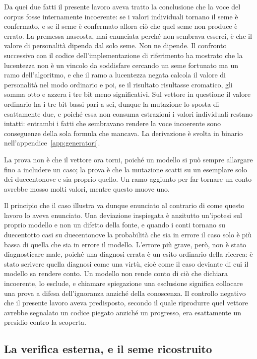 Da quei due fatti il presente lavoro aveva tratto la conclusione che la voce del corpus fosse internamente incoerente: se i valori individuali tornano il seme è confermato, e se il seme è confermato allora ciò che quel seme non produce è errato. La premessa nascosta, mai enunciata perché non sembrava esserci, è che il valore di personalità dipenda dal solo seme. Non ne dipende. Il confronto successivo con il codice dell'implementazione di riferimento ha mostrato che la lucentezza non è un vincolo da soddisfare cercando un seme fortunato ma un ramo dell'algoritmo, e che il ramo a lucentezza negata calcola il valore di personalità nel modo ordinario e poi, se il risultato risultasse cromatico, gli somma otto e azzera i tre bit meno significativi. Sul vettore in questione il valore ordinario ha i tre bit bassi pari a sei, dunque la mutazione lo sposta di esattamente due, e poiché essa non consuma estrazioni i valori individuali restano intatti: entrambi i fatti che sembravano rendere la voce incoerente sono conseguenze della sola formula che mancava. La derivazione è svolta in binario nell'appendice~\ref{app:generatori}.

La prova non è che il vettore ora torni, poiché un modello si può sempre allargare fino a includere un caso; la prova è che la mutazione scatti su un esemplare solo dei duecentonove e sia proprio quello. Un ramo aggiunto per far tornare un conto avrebbe mosso molti valori, mentre questo muove uno.

Il principio che il caso illustra va dunque enunciato al contrario di come questo lavoro lo aveva enunciato. Una deviazione inspiegata è anzitutto un'ipotesi sul proprio modello e non un difetto della fonte, e quando i conti tornano su duecentotto casi su duecentonove la probabilità che sia in errore il caso solo è più bassa di quella che sia in errore il modello. L'errore più grave, però, non è stato diagnosticare male, poiché una diagnosi errata è un esito ordinario della ricerca: è stato scrivere quella diagnosi come una virtù, cioè come il caso deviante di cui il modello sa rendere conto. Un modello non rende conto di ciò che dichiara incoerente, lo esclude, e chiamare spiegazione una esclusione significa collocare una prova a difesa dell'ignoranza anziché della conoscenza. Il controllo negativo che il presente lavoro aveva predisposto, secondo il quale riprodurre quel vettore avrebbe segnalato un codice piegato anziché un progresso, era esattamente un presidio contro la scoperta.

\subsection*{La verifica esterna, e il seme ricostruito}

